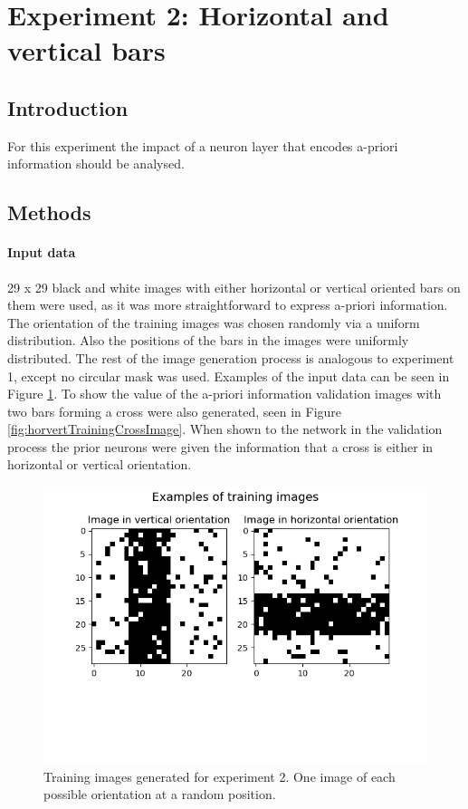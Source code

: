 \section{Experiment 2: Horizontal and vertical bars}
\label{section:horvert}

 \subsection{Introduction}

For this experiment the impact of a neuron layer that encodes a-priori information should be analysed.

\subsection{Methods}

\paragraph{Input data}
29 x 29 black and white images with either horizontal or vertical oriented bars on them were used, as it was more straightforward to express a-priori information. The orientation of the training images was chosen randomly via a uniform distribution. Also the positions of the bars in the images were uniformly distributed. The rest of the image generation process is analogous to experiment 1, except no circular mask was used. Examples of the input data can be seen in Figure \ref{fig:horvertImages}. To show the value of the a-priori information validation images with two bars forming a cross were also generated, seen in Figure \ref{fig:horvertTrainingCrossImage}. When shown to the network in the validation process the prior neurons were given the information that a cross is either in horizontal or vertical orientation.

\begin{figure}
  \includegraphics[width=\linewidth]{figures/horvert/horvertTrainingImages.png}
  \caption{Training images generated for experiment 2. One image of each possible orientation at a random position.}
  \label{fig:horvertImages}
\end{figure}

